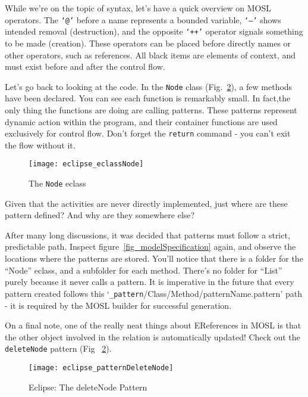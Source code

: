 While we're on the topic of syntax, let's have a quick overview on MOSL operators. The \texttt{`@'} before a name represents a bounded variable, \texttt{`--'}
shows intended removal (destruction), and the opposite \texttt{`++'} operator signals something to be made (creation). These operators can be placed before
directly names or other operators, such as references.  All black items are elements of context, and must exist before and after the control flow.

Let's go back to looking at the code. In the \texttt{Node} class (Fig.~\ref{fig_patternDeleteNode}), a few methods have been declared. You can see each function
is remarkably small. In fact,the only thing the functions are doing are calling patterns. These patterns represent dynamic action within the program, and their
container functions are used exclusively for control flow. Don't forget the \texttt{return} command - you can't exit the flow without it.

 \begin{figure}[htbp]
  \centering
  \texttt{[image: eclipse\_eclassNode]}
  \caption{The \texttt{Node} eclass}
  \label{fig_eclassNode}
\end{figure}

Given that the activities are never directly implemented, just where are these pattern defined? And why are they somewhere else?

After many long discussions, it was decided that patterns must follow a strict, predictable path. Inspect figure~\ref{fig_modelSpecification} again, and observe
the locations where the patterns are stored. You'll notice that there is a folder for the ``Node'' eclass, and a subfolder for each method. There's no folder
for ``List'' purely because it never calls a pattern. It is imperative in the future that every pattern created follows this
`\texttt{\_pattern}/Class/Method/patternName.pattern' path - it is required by the MOSL builder for successful generation.

On a final note, one of the really neat things about EReferences in MOSL is that the other object involved in the relation is automatically updated! Check out
the \texttt{deleteNode} pattern (Fig ~\ref{fig_patternDeleteNode}).

 \begin{figure}[htbp]
  \centering
  \texttt{[image: eclipse\_patternDeleteNode]}
  \caption{Eclipse: The deleteNode Pattern}
  \label{fig_patternDeleteNode}
\end{figure}


